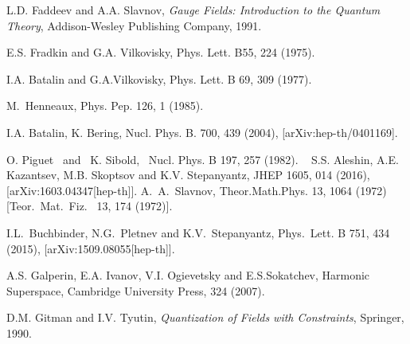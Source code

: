\documentclass[10pt]{article}
\begin{document}
\begin{thebibliography}{99}
L.D. Faddeev  and   A.A. Slavnov, \emph{Gauge Fields: Introduction to the Quantum Theory}, Addison-Wesley Publishing Company, 1991.

 E.S. Fradkin and G.A. Vilkovisky, Phys. Lett. {B55, } 224
(1975).

 I.A. Batalin and G.A.Vilkovisky, Phys. Lett. B 69, 309 (1977).

M.~Henneaux, %
 Phys. Pep. 126, 1 (1985).

 I.A. Batalin, K. Bering,  Nucl. Phys. B. 700, 439 (2004), [arXiv:hep-th/0401169].

O. Piguet  and  K. Sibold,  Nucl. Phys. B 197, 257 (1982).
  
 S.S. Aleshin, A.E. Kazantsev, M.B. Skoptsov and   K.V. {Stepanyantz},  JHEP 1605,  014 (2016), [arXiv:1603.04347[hep-th]].%
 A.~A.~Slavnov,
  Theor.Math.Phys. { 13}, 1064 (1972)
   [Teor.\ Mat.\ Fiz.\  { 13}, 174 (1972)].


I.L.~Buchbinder, N.G.~Pletnev and K.V.~Stepanyantz,
  Phys.\ Lett. B  751,  434 (2015), [arXiv:1509.08055[hep-th]].

 A.S. Galperin, E.A. Ivanov, V.I. Ogievetsky and E.S.Sokatchev,  Harmonic Superspace,  Cambridge University Press,   324 (2007).

D.M. Gitman and I.V. Tyutin, \emph{Quantization of Fields
with Constraints}, Springer, 1990.

\end{thebibliography}
\end{document}
